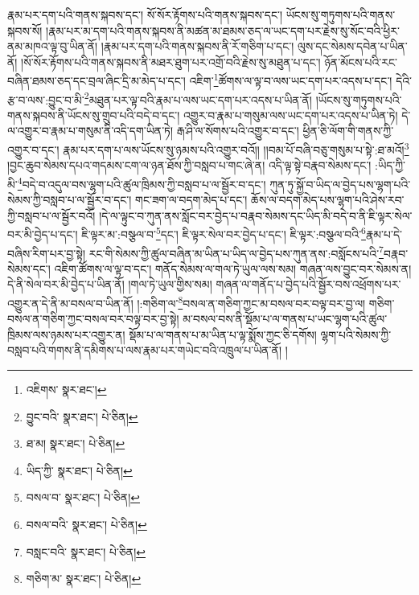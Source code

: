 རྣམ་པར་དག་པའི་གནས་སྐབས་དང་། སོ་སོར་རྟོགས་པའི་གནས་སྐབས་དང་། ཡོངས་སུ་གཏུགས་པའི་གནས་སྐབས་སོ། །རྣམ་པར་མ་དག་པའི་གནས་སྐབས་ནི་མཚན་མ་ཐམས་ཅད་ལ་ཡང་དག་པར་རྗེས་སུ་སོང་བའི་ཕྱིར་ནམ་མཁའ་ལྟ་བུ་ཡིན་ནོ། །རྣམ་པར་དག་པའི་གནས་སྐབས་ནི་རོ་གཅིག་པ་དང་། ལུས་དང་སེམས་དབེན་པ་ཡིན་ནོ། །སོ་སོར་རྟོགས་པའི་གནས་སྐབས་ནི་མཐར་ཐུག་པར་འགྲོ་བའི་རྗེས་སུ་མཐུན་པ་དང་། ཉོན་མོངས་པའི་རང་བཞིན་ཐམས་ཅད་དང་བྲལ་ཞིང་དྲི་མ་མེད་པ་དང་། འཇིག་\footnote{འཇིགས་  སྣར་ཐང་། }ཚོགས་ལ་ལྟ་བ་ལས་ཡང་དག་པར་འདས་པ་དང་། དེའི་རྩ་བ་ལས་:བྱུང་བ་མི་\footnote{བྱུང་བའི་  སྣར་ཐང་།  པེ་ཅིན། }མཐུན་པར་ལྟ་བའི་རྣམ་པ་ལས་ཡང་དག་པར་འདས་པ་ཡིན་ནོ། །ཡོངས་སུ་གཏུགས་པའི་གནས་སྐབས་ནི་ཡོངས་སུ་གྲུབ་པའི་བདེ་བ་དང་། འགྱུར་བ་རྣམ་པ་གསུམ་ལས་ཡང་དག་པར་འདས་པ་ཡིན་ཏེ། དེ་ལ་འགྱུར་བ་རྣམ་པ་གསུམ་ནི་འདི་དག་ཡིན་ཏེ། རྒ་ཤི་ལ་སོགས་པའི་འགྱུར་བ་དང་། ཕྱིན་ཅི་ལོག་གི་གནས་ཀྱི་འགྱུར་བ་དང་། རྣམ་པར་དག་པ་ལས་ཡོངས་སུ་ཉམས་པའི་འགྱུར་བའོ།། །།བམ་པོ་བཞི་བཅུ་གསུམ་པ་སྟེ་:ཐ་མའོ།\footnote{ཐ་མ།  སྣར་ཐང་།  པེ་ཅིན། } །བྱང་ཆུབ་སེམས་དཔའ་གདམས་ངག་ལ་ཉན་ཐོས་ཀྱི་བསླབ་པ་གང་ཞེ་ན། འདི་ལྟ་སྟེ་བརྣབ་སེམས་དང་། :ཡིད་ཀྱི་མི་\footnote{ཡིད་ཀྱི་  སྣར་ཐང་།  པེ་ཅིན། }བདེ་བ་འདུལ་བས་ལྷག་པའི་ཚུལ་ཁྲིམས་ཀྱི་བསླབ་པ་ལ་སྦྱོར་བ་དང་། ཀུན་ཏུ་སྐྱོ་བ་ཡིད་ལ་བྱེད་པས་ལྷག་པའི་སེམས་ཀྱི་བསླབ་པ་ལ་སྦྱོར་བ་དང་། གང་ཟག་ལ་བདག་མེད་པ་དང་། ཆོས་ལ་བདག་མེད་པས་ལྷག་པའི་ཤེས་རབ་ཀྱི་བསླབ་པ་ལ་སྦྱོར་བའོ། །དེ་ལ་ལྟུང་བ་ཀུན་ནས་སློང་བར་བྱེད་པ་བརྣབ་སེམས་དང་ཡིད་མི་བདེ་བ་ནི་ཇི་ལྟར་སེལ་བར་མི་བྱེད་པ་དང་། ཇི་ལྟར་མ་:བསྩལ་བ་\footnote{བསལ་བ་  སྣར་ཐང་།  པེ་ཅིན། }དང་། ཇི་ལྟར་སེལ་བར་བྱེད་པ་དང་། ཇི་ལྟར་:བསྩལ་བའི་\footnote{བསལ་བའི་  སྣར་ཐང་།  པེ་ཅིན། }རྣམ་པ་དེ་བཞིས་རིག་པར་བྱ་སྟེ། རང་གི་སེམས་ཀྱི་ཚུལ་བཞིན་མ་ཡིན་པ་ཡིད་ལ་བྱེད་པས་ཀུན་ནས་:བསློངས་པའི་\footnote{བསླང་བའི་  སྣར་ཐང་།  པེ་ཅིན། }བརྣབ་སེམས་དང་། འཇིག་ཚོགས་ལ་ལྟ་བ་དང་། གནོད་སེམས་ལ་གལ་ཏེ་ཡུལ་ལས་སམ། གཞན་ལས་བྱུང་བར་སེམས་ན། དེ་ནི་སེལ་བར་མི་བྱེད་པ་ཡིན་ནོ། །གལ་ཏེ་ཡུལ་གྱིས་སམ། གཞན་ལ་གནོད་པ་བྱེད་པའི་སྦྱོར་བས་འཕྲོགས་པར་འགྱུར་ན་དེ་ནི་མ་བསལ་བ་ཡིན་ནོ། །:གཅིག་ལ་\footnote{གཅིག་མ་  སྣར་ཐང་།  པེ་ཅིན། }བསལ་ན་གཅིག་ཀྱང་མ་བསལ་བར་བལྟ་བར་བྱ་ལ། གཅིག་བསལ་ན་གཅིག་ཀྱང་བསལ་བར་བལྟ་བར་བྱ་སྟེ། མ་བསལ་བས་ནི་སྡོམ་པ་ལ་གནས་པ་ཡང་ལྷག་པའི་ཚུལ་ཁྲིམས་ལས་ཉམས་པར་འགྱུར་ན། སྡོམ་པ་ལ་གནས་པ་མ་ཡིན་པ་ལྟ་སྨོས་ཀྱང་ཅི་དགོས། ལྷག་པའི་སེམས་ཀྱི་བསླབ་པའི་གགས་ནི་དམིགས་པ་ལས་རྣམ་པར་གཡེང་བའི་འཁྲུལ་པ་ཡིན་ནོ། །
